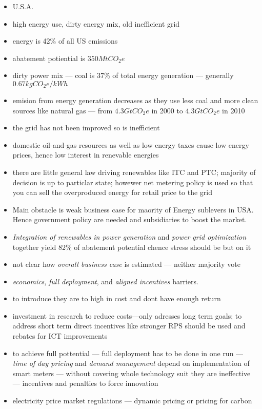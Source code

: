 \documentclass[11pt, twocolumn]{article}
\begin{document}
\begin{itemize}
\item U.S.A.
\item high energy use, dirty energy mix, old inefficient grid
\item energy is 42\% of all US emissions
\item abatement potiential is $350 MtCO_2e$
\item dirty power mix --- coal is 37\% of total energy generation --- generally $0.67 kgCO_2e / kWh$
\item emision from energy generation decreases as they use less coal and more clean sources like natural gas --- from $4.3 GtCO_2e$ in 2000 to $4.3 GtCO_2e$ in 2010
\item the grid has not been improved so is inefficient
\item domestic oil-and-gas resources as well as low energy taxes cause low energy prices, hence low interest in renevable energies
\item there are little general law driving renewables like ITC and PTC; majority of decision is up to particlar state; howewer net metering policy is used so that you can sell the overproduced energy for retail price to the grid

\item Main obstacle is weak business case for maority of Energy sublevers in USA. Hence government policy are needed and subsidiaries to boost the market.
\item \emph{Integration of renewables in power generation} and \emph{power grid optimization} together yield 82\% of abatement potential chence stress should be but on it
\item not clear how \emph{overall business case} is estimated --- neither majority vote
\item \emph{economics}, \emph{full deployment}, and \emph{aligned incentives} barriers.
\item to introduce they are to high in cost and dont have enough return
\item investment in research to reduce costs---only adresses long term goals; to address short term direct incentives like stronger RPS should be used and rebates for ICT improvements

\item to achieve full pottential --- full deployment has to be done in one run --- \emph{time of day pricing} and \emph{demand management} depend on implementation of smart meters --- without covering whole technology suit they are ineffective --- incentives and penalties to force innovation
\item electricity price market regulations --- dynamic pricing or pricing for carbon



\end{itemize}
\end{document}
